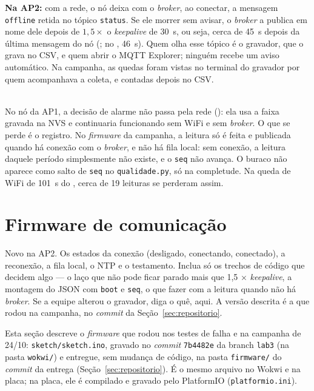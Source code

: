 \begin{description}[style=unboxed, leftmargin=0pt, font=\normalfont\bfseries]
    \textbf{Na AP2:} com a rede, o nó deixa com o \emph{broker}, ao
    conectar, a mensagem \texttt{offline} retida no tópico
    \texttt{status}. Se ele morrer sem avisar, o \emph{broker} a publica
    em nome dele depois de $1{,}5 \times$ o \emph{keepalive} de
    \SI{30}{\second}, ou seja, cerca de \SI{45}{\second} depois da última
    mensagem do nó (; no , \SI{46}{\second}). Quem olha esse
    tópico é o gravador, que o grava no CSV, e quem abrir o MQTT Explorer;
    ninguém recebe um aviso automático. Na campanha, as quedas foram vistas
    no terminal do gravador por quem acompanhava a coleta, e contadas
    depois no CSV.
  \item[Se a rede ou o \emph{broker} caírem (AP2).]\hfill\\
    No nó da AP1, a decisão de alarme não passa pela rede (): ela
    usa a faixa gravada na NVS e continuaria funcionando sem WiFi e sem
    \emph{broker}. O que se perde é o registro. No \emph{firmware} da
    campanha, a leitura só é feita e publicada quando há conexão com o
    \emph{broker}, e não há fila local: sem conexão, a leitura daquele
    período simplesmente não existe, e o \texttt{seq} não avança. O
    buraco não aparece como salto de \texttt{seq} no \texttt{qualidade.py},
    só na completude. Na queda de WiFi de \SI{101}{\second} do ,
    cerca de 19 leituras se perderam assim.
\end{description}

\section{Firmware de comunicação}
\label{sec:firmware-com}

\begin{orientacao}
Novo na AP2. Os estados da conexão (desligado, conectando, conectado), a
reconexão, a fila local, o NTP e o testamento. Inclua só os trechos de
código que decidem algo --- o laço que não pode ficar parado mais que
1,5 $\times$ \emph{keepalive}, a montagem do JSON com \texttt{boot} e
\texttt{seq}, o que fazer com a leitura quando não há \emph{broker}. Se
a equipe alterou o gravador, diga o quê, aqui. A versão descrita é a que
rodou na campanha, no \emph{commit} da Seção~\ref{sec:repositorio}.
\end{orientacao}

Esta seção descreve o \emph{firmware} que rodou nos testes de falha e
na campanha de 24/10: \texttt{sketch/sketch.ino}, gravado no
\emph{commit} \texttt{7b4482e} da branch \texttt{lab3} (na pasta
\texttt{wokwi/}) e entregue, sem mudança de código, na pasta
\texttt{firmware/} do \emph{commit} da entrega
(Seção~\ref{sec:repositorio}). É o mesmo arquivo no Wokwi e na placa;
na placa, ele é compilado e gravado pelo PlatformIO
(\texttt{platformio.ini}).

